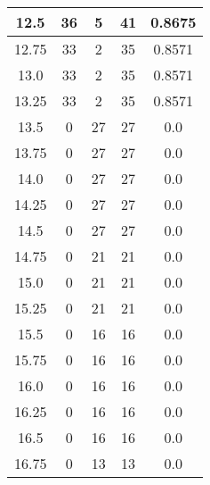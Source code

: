 \documentclass[letterpaper, 12pt]{article}
\begin{document}
\begin{longtable}{|c|c|c|c|c|}
12.5 & 36 & 5 & 41 & 0.8675 \\
\hline
12.75 & 33 & 2 & 35 & 0.8571 \\
\hline
13.0 & 33 & 2 & 35 & 0.8571 \\
\hline
13.25 & 33 & 2 & 35 & 0.8571 \\
\hline
13.5 & 0 & 27 & 27 & 0.0 \\
\hline
13.75 & 0 & 27 & 27 & 0.0 \\
\hline
14.0 & 0 & 27 & 27 & 0.0 \\
\hline
14.25 & 0 & 27 & 27 & 0.0 \\
\hline
14.5 & 0 & 27 & 27 & 0.0 \\
\hline
14.75 & 0 & 21 & 21 & 0.0 \\
\hline
15.0 & 0 & 21 & 21 & 0.0 \\
\hline
15.25 & 0 & 21 & 21 & 0.0 \\
\hline
15.5 & 0 & 16 & 16 & 0.0 \\
\hline
15.75 & 0 & 16 & 16 & 0.0 \\
\hline
16.0 & 0 & 16 & 16 & 0.0 \\
\hline
16.25 & 0 & 16 & 16 & 0.0 \\
\hline
16.5 & 0 & 16 & 16 & 0.0 \\
\hline
16.75 & 0 & 13 & 13 & 0.0 \\
\hline
\end{longtable}
\end{document}
